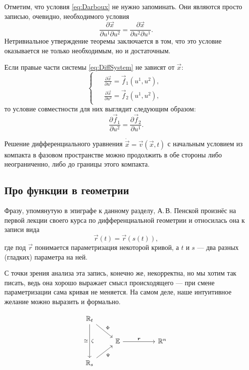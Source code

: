 Отметим, что условия \eqref{eq:Darboux} не нужно запоминать. Они являются просто записью, очевидно, необходимого условия
\[
	\frac{\partial\vec{x}}{\partial u^1 \partial u^2} = \frac{\partial\vec{x}}{\partial u^2 \partial u^1}.
\]
Нетривиальное утверждение теоремы заключается в том, что это условие оказывается не только необходимым, но и достаточным.

\begin{example} \label{example:SimpleDiffJointness}
	Если правые части системы \eqref{eq:DiffSystem} не зависят от $\vec{x}$:
	\[
		\begin{cases}
			\begin{aligned}
				&\frac{\partial\vec{x}}{\partial u^1} = \vec{f}_1(u^1, u^2),\\
				&\frac{\partial\vec{x}}{\partial u^2} = \vec{f}_2(u^1, u^2),
			\end{aligned}
		\end{cases}
	\]
	то условие совместности для них выглядит следующим образом:
	\[
		\frac{\partial\vec{f}_1}{\partial u^2} = \frac{\partial\vec{f}_2}{\partial u^1}.
	\]
\end{example}

\begin{theorem}[О продолжении] \label{theorem:ContinuityDifferential}
	Решение дифференциального уравнения $\dot{\vec{x}} = \vec{v}(\vec{x}, t)$ с начальным условием из компакта в фазовом пространстве можно продолжить в обе стороны либо неограниченно, либо до границы этого компакта.
\end{theorem}

\subsection{Про функции в геометрии}

Фразу, упомянутую в эпиграфе к данному разделу, А.\,В. Пенской произнёс на первой лекции своего курса по дифференциальной геометрии и относилась она к записи вида
\[
	\vec{r}(t) = \vec{r}(s(t)),
\]
где под $\vec{r}$ понимается параметризация некоторой кривой, а $t$ и $s$ --- два разных (гладких) параметра на ней.

С точки зрения анализа эта запись, конечно же, некорректна, но мы хотим так писать, ведь она хорошо выражает смысл происходящего --- при смене параметризации сама кривая не меняется. На самом деле, наше интуитивное желание можно выразить и формально.

%
\[\begin{tikzcd}
	{\R_t} \\
	& {\mathbb{E}} && {\mathbb{R}^n} \\
	{\R_s}
	\arrow["\Phi", from=1-1, to=2-2]
	\arrow["\vec{r}", from=2-2, to=2-4]
	\arrow["\Psi"', from=3-1, to=2-2]
	\arrow["\homeo" left, "\zeta" right, from=1-1, to=3-1]
\end{tikzcd}\]
%

